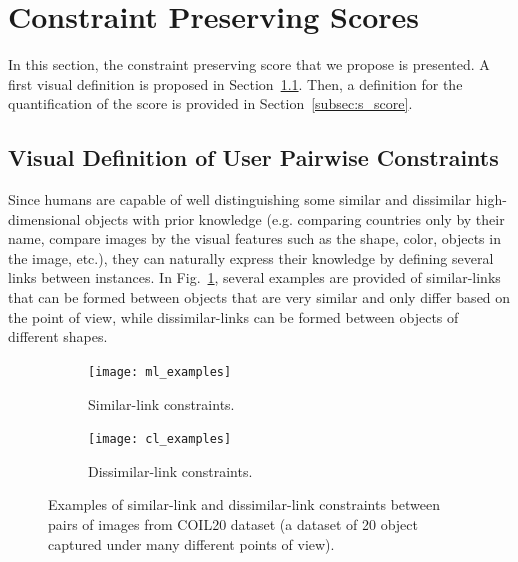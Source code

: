 \section{Constraint Preserving Scores}\label{sec:proposed_method}

In this section, the constraint preserving score that we propose is presented. A first visual definition is proposed in Section~\ref{subsec:visual_def}. Then, a definition for the quantification of the score is provided in Section~\ref{subsec:s_score}.

\subsection{Visual Definition of User Pairwise Constraints}\label{subsec:visual_def}

Since humans are capable of well distinguishing some similar and dissimilar high-dimensional objects with prior knowledge (e.g. comparing countries only by their name, compare images by the visual features such as the shape, color, objects in the image, etc.), they can naturally express their knowledge by defining several links between instances.
In Fig.~\ref{fig:ml_cl_examples}, several examples are provided of similar-links that can be formed between objects that are very similar and only differ based on the point of view, while dissimilar-links can be formed between objects of different shapes.

\begin{figure}
    \centering
    \begin{subfigure}[c]{0.48\linewidth}
        \texttt{[image: ml\_examples]}
        \caption{\footnotesize{Similar-link constraints.}}
    \end{subfigure}
    \begin{subfigure}[c]{0.48\linewidth}
        \texttt{[image: cl\_examples]}
        \caption{\footnotesize{Dissimilar-link constraints.}}
    \end{subfigure}
    \caption{Examples of similar-link and dissimilar-link constraints between pairs of images from COIL20 dataset (a dataset of 20 object captured under many different points of view).}
    \label{fig:ml_cl_examples}
\end{figure}

